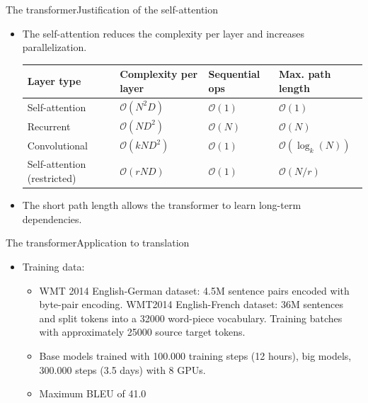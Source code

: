 \documentclass{beamer}
\begin{document}
\begin{frame}{The transformer}{Justification of the self-attention}
\begin{itemize}
    \item The self-attention reduces the complexity per layer and increases parallelization.

    \begin{table}
\begin{tabular}{m{2.5cm}
|m{2cm} m{2cm} m{2cm}}
\hline
Layer type                     & Complexity per layer             & Sequential ops                    & Max. path length \\
\hline
Self-attention                 &$ \mathcal{O}(N^2D) $              & $\mathcal{O}(1)$                  & $\mathcal{O}(1) $               \\
Recurrent                      & $\mathcal{O}(ND^2) $              &$ \mathcal{O}(N) $                 & $\mathcal{O}(N) $               \\
Convolutional                  &$ \mathcal{O}(kND^2)$              & $\mathcal{O}(1)  $                &$ \mathcal{O}(\log_k(N))$         \\
Self-attention (restricted)    & $\mathcal{O}(rND)$               &$ \mathcal{O}(1) $                 & $\mathcal{O}(N/r) $    \\
\hline
\end{tabular}
\end{table}
\item The short path length allows the transformer to learn long-term dependencies.
\end{itemize}
\end{frame}
\begin{frame}{The transformer}{Application to translation}
\begin{itemize}
    \item Training data: 
    \begin{itemize}
    \item WMT 2014 English-German dataset: 4.5M sentence pairs encoded with byte-pair encoding. WMT2014 English-French dataset: 36M sentences and split tokens into a 32000 word-piece vocabulary.  Training batches with approximately 25000 source target tokens.
    \item Base models trained with 100.000 training steps (12 hours), big models, 300.000 steps (3.5 days) with 8 GPUs.
    \item Maximum BLEU of 41.0
    \end{itemize}
\end{itemize}

\end{frame}
\end{document}
